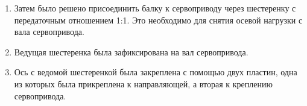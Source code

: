 \begin{enumerate}
\begin{enumerate}
      \item Затем было решено присоединить балку к сервоприводу через шестеренку с передаточным отношением 1:1. Это необходимо для снятия осевой нагрузки с вала сервопривода.
      
      \item Ведущая шестеренка была зафиксирована на вал сервопривода.
      
      \item Ось с ведомой шестеренкой была закреплена с помощью двух пластин, одна из которых была прикреплена к направляющей, а вторая к креплению сервопривода.
      \begin{figure}[H]
      	\begin{minipage}[h]{0.47\linewidth}
      	\end{minipage}
      	\hfill
      	\begin{minipage}[h]{0.47\linewidth}

\end{minipage}
\end{figure}
\end{enumerate}
\end{enumerate}
